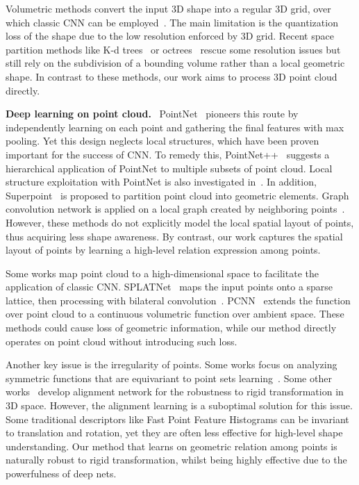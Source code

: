 \documentclass[10pt,twocolumn,letterpaper]{article}
\begin{document}
Volumetric methods convert the input 3D shape into a regular 3D grid, over which classic CNN can be employed~\cite{modelnet40,vox2,c45}. The main limitation is the quantization loss of the shape due to the low resolution enforced by 3D grid. Recent space partition methods like K-d trees~\cite{c26} or octrees~\cite{c29,vox3,c53} rescue some resolution issues but still rely on the subdivision of a bounding volume rather than a local geometric shape. In contrast to these methods, our work aims to process 3D point cloud directly.

\noindent \textbf{Deep learning on point cloud.}\,\,~PointNet~\cite{c1_pointnet} pioneers this route by independently learning on each point and gathering the final features with max pooling. Yet this design neglects local structures, which have been proven important for the success of CNN. To remedy this, PointNet++~\cite{c2_pointnet2} suggests a hierarchical application of PointNet to multiple subsets of point cloud. Local structure exploitation with PointNet is also investigated in~\cite{PCPNet, c9_kcnet}. In addition, Superpoint~\cite{c8_superpoint} is proposed to partition point cloud into geometric elements. Graph convolution network is applied on a local graph created by neighboring points~\cite{c14_scn,c19,c30}. However, these methods do not explicitly model the local spatial layout of points, thus acquiring less shape awareness. By contrast, our work captures the spatial layout of points by learning a high-level relation expression among points.

Some works map point cloud to a high-dimensional space to facilitate the application of classic CNN. SPLATNet~\cite{c10_splatnet} maps the input points onto a sparse lattice, then processing with bilateral convolution~\cite{bcl}. PCNN~\cite{c16_eocnn} extends the function over point cloud to a continuous volumetric function over ambient space. These methods could cause loss of geometric information, while our method directly operates on point cloud without introducing such loss.

Another key issue is the irregularity of points. Some works focus on analyzing symmetric functions that are equivariant to point sets learning~\cite{c1_pointnet,c6_synccnn,c24,c20}. Some other works~\cite{c1_pointnet,c27} develop alignment network for the robustness to rigid transformation in 3D space. However, the alignment learning is a suboptimal solution for this issue. Some traditional descriptors like Fast Point Feature Histograms can be invariant to translation and rotation, yet they are often less effective for high-level shape understanding. Our method that learns on geometric relation among points is naturally robust to rigid transformation, whilst being highly effective due to the powerfulness of deep nets.
\end{document}
